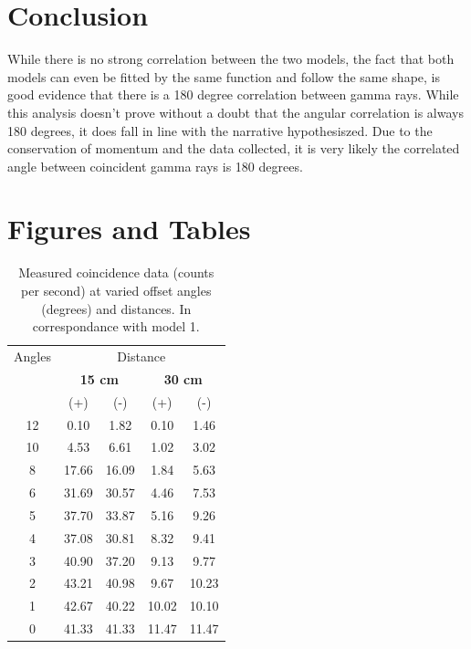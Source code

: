 \documentclass[12pt, letterpaper, twocolumn]{article}
\newcommand\mcc[1]{\multicolumn{2}{c}{#1}}
\begin{document}
\section{Conclusion}
While there is no strong correlation between the two models, the fact that
both models can even be fitted by the same function and follow the same shape,
is good evidence that there is a 180 degree correlation between gamma rays.
While this analysis doesn't prove without a doubt that the angular correlation
is always 180 degrees, it does fall in line with the narrative hypothesiszed.
Due to the conservation of momentum and the data collected, it is very likely
the correlated angle between coincident gamma rays is 180 degrees.

\newpage

\section{Figures and Tables}
\begin{table}[H]
\centering
\begin{tabular}{ccccc}
\toprule
{Angles} & \multicolumn{4}{c}{Distance}\\\cmidrule{2-5}
& \mcc{\textbf{15 cm}}
& \mcc{\textbf{30 cm}}\\
\cmidrule{2-3} \cmidrule{4-5}
& {(+)}  & {(-)} & {(+)} & {(-)} \\
\midrule
12 & 0.10 & 1.82 & 0.10 & 1.46\\\hline
10 & 4.53 & 6.61 & 1.02 & 3.02\\\hline
8 & 17.66 & 16.09 & 1.84 & 5.63\\\hline
6 & 31.69 & 30.57 & 4.46 & 7.53\\\hline
5 & 37.70 & 33.87 & 5.16 & 9.26\\\hline
4 & 37.08 & 30.81 & 8.32 & 9.41\\\hline
3 & 40.90 & 37.20 & 9.13 & 9.77\\\hline
2 & 43.21 & 40.98 & 9.67 & 10.23\\\hline
1 & 42.67 & 40.22 & 10.02 & 10.10\\\hline
0 & 41.33 & 41.33 & 11.47 & 11.47\\\hline
\bottomrule
\end{tabular}
\caption{Measured coincidence data (counts per second) at varied offset angles
(degrees) and distances. In correspondance with model 1.}
\label{table:model1_table}
\end{table}
\end{document}
